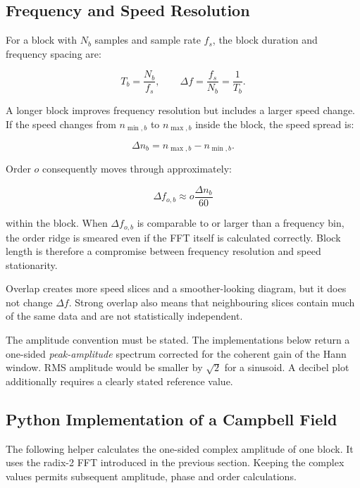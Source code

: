 \subsection{Frequency and Speed Resolution}

For a block with $ N_b $ samples and sample rate $ f_s $, the block duration and
frequency spacing are:

\begin{equation}
    T_b=\frac{N_b}{f_s},
    \qquad
    \Delta f=\frac{f_s}{N_b}=\frac{1}{T_b}.
\end{equation}

A longer block improves frequency resolution but includes a larger speed change.
If the speed changes from $ n_{\min,b} $ to $ n_{\max,b} $ inside the block, the
speed spread is:

\begin{equation}
    \Delta n_b=n_{\max,b}-n_{\min,b}.
\end{equation}

Order $ o $ consequently moves through approximately:

\begin{equation}\label{order-smear-estimate}
    \Delta f_{o,b}
    \approx o\frac{\Delta n_b}{60}
\end{equation}

within the block. When $ \Delta f_{o,b} $ is comparable to or larger than a
frequency bin, the order ridge is smeared even if the FFT itself is calculated
correctly. Block length is therefore a compromise between frequency resolution
and speed stationarity.

Overlap creates more speed slices and a smoother-looking diagram, but it does
not change $ \Delta f $. Strong overlap also means that neighbouring slices
contain much of the same data and are not statistically independent.

The amplitude convention must be stated. The implementations below return a
one-sided \textit{peak-amplitude} spectrum corrected for the coherent gain of the
Hann window. RMS amplitude would be smaller by $ \sqrt{2} $ for a sinusoid. A
decibel plot additionally requires a clearly stated reference value.

\subsection{Python Implementation of a Campbell Field}

The following helper calculates the one-sided complex amplitude of one block.
It uses the radix-2 FFT introduced in the previous section. Keeping the complex
values permits subsequent amplitude, phase and order calculations.

